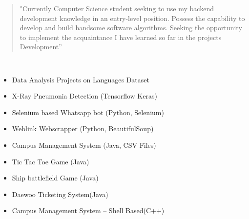 \documentclass[10pt,a4paper,ragged2e,withhyper]{altacv}
\begin{document}
\begin{paracol}{2}
\switchcolumn


\begin{quote}
"Currently Computer Science student seeking to use my backend 
development knowledge in an entry-level position. Possess the 
capability to develop and build handsome software algorithms. 
Seeking the opportunity to implement the acquaintance I have learned 
so far in the projects Development''
\end{quote}





\divider\smallskip



\\


\divider\smallskip


\divider\smallskip



\begin{itemize}
\item Data Analysis Projects on Languages Dataset
\item X-Ray Pneumonia Detection (Tensorflow Keras)
\item Selenium based Whatsapp bot (Python, Selenium)
\item Weblink Webscrapper (Python, BeautifulSoup)
\item Campus Management System (Java, CSV Files)
\item Tic Tac Toe Game (Java)
\item Ship battlefield Game (Java)
\item Daewoo Ticketing System(Java)
\item Campus Management System -- Shell Based(C++)
\end{itemize}
\divider
{}


\end{paracol}
\end{document}
